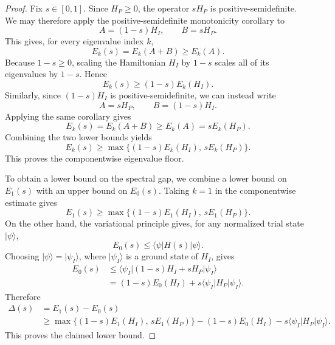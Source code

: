 \documentclass[11pt, a4paper]{article}
\newcommand{\ket}[1]{| #1 \rangle}
\newcommand{\opvalue}[3]{\langle #1 | #2 | #3 \rangle}
\begin{document}
\begin{proof}
Fix $s\in[0,1]$. Since $H_P\ge 0$, the operator $sH_P$ is positive-semidefinite. We may therefore apply the positive-semidefinite monotonicity corollary to
\begin{equation}
A=(1-s)H_I,
\qquad
B=sH_P.
\end{equation}
This gives, for every eigenvalue index $k$,
\begin{equation}
E_k(s)=E_k(A+B)
\ge E_k(A).
\end{equation}
Because $1-s\ge 0$, scaling the Hamiltonian $H_I$ by $1-s$ scales all of its eigenvalues by $1-s$. Hence
\begin{equation}
E_k(s)
\ge
(1-s)E_k(H_I).
\end{equation}
Similarly, since $(1-s)H_I$ is positive-semidefinite, we can instead write
\begin{equation}
A=sH_P,
\qquad
B=(1-s)H_I.
\end{equation}
Applying the same corollary gives
\begin{equation}
E_k(s)=E_k(A+B)
\ge E_k(A)=sE_k(H_P).
\end{equation}
Combining the two lower bounds yields
\begin{equation}
E_k(s)
\ge
\max\{(1-s)E_k(H_I),\,sE_k(H_P)\}.
\end{equation}
This proves the componentwise eigenvalue floor.

To obtain a lower bound on the spectral gap, we combine a lower bound on $E_1(s)$ with an upper bound on $E_0(s)$. Taking $k=1$ in the componentwise estimate gives
\begin{equation}
E_1(s)
\ge
\max\{(1-s)E_1(H_I),\,sE_1(H_P)\}.
\end{equation}
On the other hand, the variational principle gives, for any normalized trial state $\ket{\psi}$,
\begin{equation}
E_0(s)\le \opvalue{\psi}{H(s)}{\psi}.
\end{equation}
Choosing $\ket{\psi}=\ket{\psi_I}$, where $\ket{\psi_I}$ is a ground state of $H_I$, gives
\begin{align}
E_0(s)
&\le \opvalue{\psi_I}{(1-s)H_I+sH_P}{\psi_I}\\
&=(1-s)E_0(H_I)+s\opvalue{\psi_I}{H_P}{\psi_I}.
\end{align}
Therefore
\begin{align}
\Delta(s)&=E_1(s)-E_0(s)\\
&\ge
\max\{(1-s)E_1(H_I),\,sE_1(H_P)\}
-(1-s)E_0(H_I)-s\opvalue{\psi_I}{H_P}{\psi_I}.
\end{align}
This proves the claimed lower bound.
\end{proof}
\end{document}
